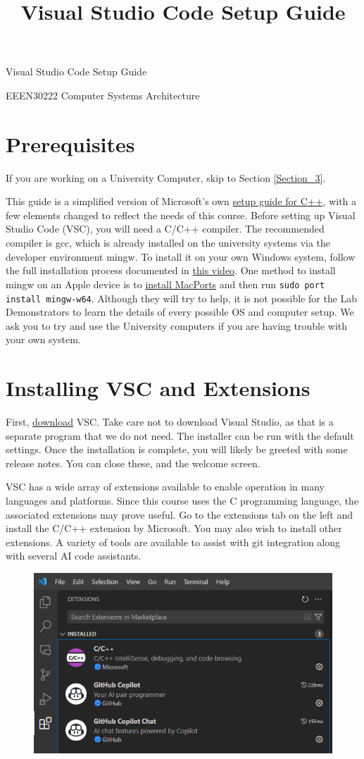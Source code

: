 \documentclass{article}
\title{Visual Studio Code Setup Guide}
\newcommand{\code}[1]{\colorbox{codegrey}{\lstinline|#1|}}
\begin{document}
\centering
\Large Visual Studio Code Setup Guide\par
\large EEEN30222 Computer Systems Architecture

\normalsize\raggedright
\section{Prerequisites}

If you are working on a University Computer, skip to Section \ref{Section_3}.


This guide is a simplified version of Microsoft's own \href{https://code.visualstudio.com/docs/cpp/config-mingw}{setup guide for C++}, with a few elements changed to reflect the needs of this course. 
Before setting up Visual Studio Code (VSC), you will need a C/C++ compiler. The recommended compiler is gcc, which is already installed on the university systems via the developer environment mingw. To install it on your own Windows system, follow the full installation process documented in \href{https://www.youtube.com/watch?v=oC69vlWofJQ}{this video}. One method to install mingw on an Apple device is to \href{https://www.macports.org/install.php}{install MacPorts} and then run \code{sudo port install mingw-w64}. Although they will try to help, it is not possible for the Lab Demonstrators to learn the details of every possible OS and computer setup. We ask you to try and use the University computers if you are having trouble with your own system. 

\section{Installing VSC and Extensions}
First, \href{https://code.visualstudio.com/download}{download} VSC. Take care not to download Visual Studio, as that is a separate program that we do not need. The installer can be run with the default settings. Once the installation is complete, you will likely be greeted with some release notes. You can close these, and the welcome screen. \par
VSC has a wide array of extensions available to enable operation in many languages and platforms. Since this course uses the C programming language, the associated extensions may prove useful. 
Go to the extensions tab on the left and install the C/C++ extension by Microsoft. You may also wish to install other extensions. A variety of tools are available to assist with git integration along with several AI code assistants.
\begin{figure}[h]
    \centering
    \includegraphics[width=0.5\linewidth]{extensions.png}
    \label{fig:enter-label}
\end{figure}
\end{document}
